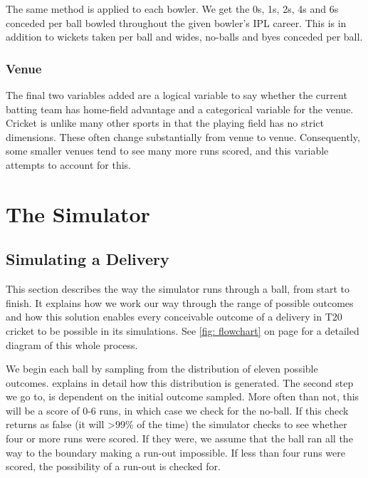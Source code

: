 The same method is applied to each bowler. We get the 0s, 1s, 2s, 4s and 6s conceded per ball bowled throughout the given bowler’s IPL career. This is in addition to wickets taken per ball and wides, no-balls and byes conceded per ball. 

\subsubsection{Venue}

The final two variables added are a logical variable to say whether the current batting team has home-field advantage and a categorical variable for the venue. Cricket is unlike many other sports in that the playing field has no strict dimensions. These often change substantially from venue to venue. Consequently, some smaller venues tend to see many more runs scored, and this variable attempts to account for this.

\section{The Simulator}
\label{sec: sim}

\subsection{Simulating a Delivery}

This section describes the way the simulator runs through a ball, from start to finish. It explains how we work our way through the range of possible outcomes and how this solution enables every conceivable outcome of a delivery in T20 cricket to be possible in its simulations.\footnotemark{} See \cref{fig: flowchart} on page \pageref{fig: flowchart} for a detailed diagram of this whole process.


We begin each ball by sampling from the distribution of eleven possible outcomes.  explains in detail how this distribution is generated. The second step we go to, is dependent on the initial outcome sampled. More often than not, this will be a score of 0-6 runs, in which case we check for the no-ball. If this check returns as false (it will >99\% of the time) the simulator checks to see whether four or more runs were scored. If they were, we assume that the ball ran all the way to the boundary making a run-out impossible. If less than four runs were scored, the possibility of a run-out is checked for.

